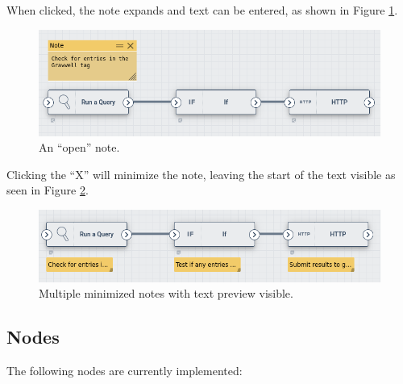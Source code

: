 When clicked, the note expands and text can be entered, as shown in Figure \ref{fig:note-open}.

\begin{figure}
	\includegraphics[width=0.6\linewidth]{images/note-open.png}
	\caption{An ``open'' note.}
	\label{fig:note-open}
\end{figure}

Clicking the ``X'' will minimize the note, leaving the start of the text visible as seen in Figure \ref{fig:note-multiple}.

\begin{figure}
	\includegraphics[width=0.6\linewidth]{images/note-multiple.png}
	\caption{Multiple minimized notes with text preview visible.}
	\label{fig:note-multiple}
\end{figure}

\clearpage
\subsection{Nodes}
\label{sec:nodes}

The following nodes are currently implemented:

